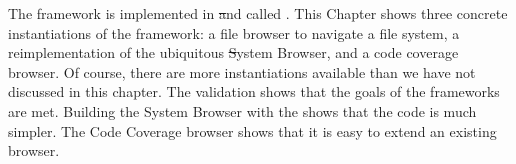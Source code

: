 \documentclass[a4paper,10pt,twoside]{book}
\begin{document}
The framework is implemented in \pharo \st and called \ob.
This Chapter shows three concrete instantiations of the framework: a file browser to navigate a file system, a reimplementation of the ubiquitous \st System Browser, and a code coverage browser.
Of course, there are more instantiations available than we have not discussed in this chapter.
The validation shows that the goals of the frameworks are met. Building the System Browser with the \obf shows that the code is much simpler. The Code Coverage browser shows that it is easy to extend an existing browser.








\ifx\wholebook\relax\else
   
   
\end{document}
